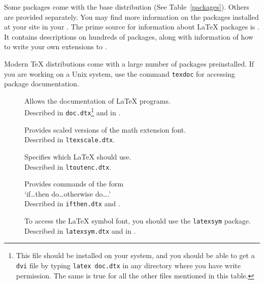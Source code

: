 Some packages come with the \LaTeXe{} base distribution
(See Table~\ref{packages}). Others are provided separately. You may
find more information on the packages installed at your site in your
\guide. The prime source for information about \LaTeX{} packages is \companion.
It contains descriptions on hundreds of packages, along with
information of how to write your own extensions to \LaTeXe.

Modern \TeX{} distributions come with a large number of packages
preinstalled. If you are working on a Unix system, use the command
\texttt{texdoc} for accessing package documentation.


\begin{table}[btp]
  \caption{Some of the Packages Distributed with \LaTeX.}\label{packages}
  \begin{lined}{\textwidth}
    \begin{description}
      \item[\normalfont{}] Allows the documentation of \LaTeX{} programs.\\
        Described in \texttt{doc.dtx}\footnote{This file should be installed
          on your system, and you should be able to get a \texttt{dvi} file
          by typing \texttt{latex doc.dtx} in any directory where you have
          write permission. The same is true for all the
          other files mentioned in this table.}  and in \companion.

      \item[\normalfont{}] Provides scaled versions of the
        math extension  font.\\
        Described in \texttt{ltexscale.dtx}.

      \item[\normalfont{}] Specifies which 
        \LaTeX{} should use.\\
        Described in \texttt{ltoutenc.dtx}.

      \item[\normalfont{}] Provides commands of the form\\
        `if\ldots then do\ldots otherwise do\ldots.'\\ Described in
        \texttt{ifthen.dtx} and \companion.

      \item[\normalfont{}] To access the \LaTeX{} symbol
        font, you should use the \texttt{latexsym} package. Described in
        \texttt{latexsym.dtx} and in \companion.


\end{description}
\end{lined}
\end{table}
